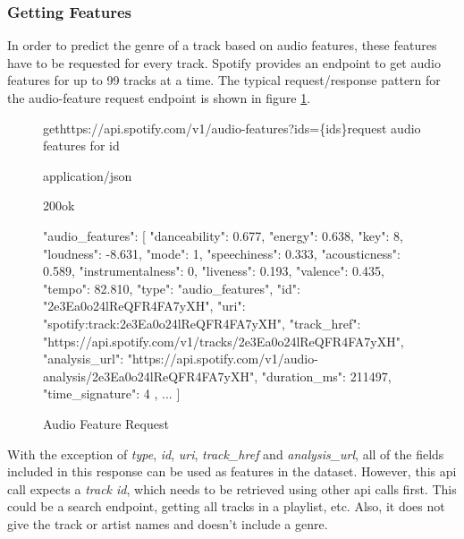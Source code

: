 \subsubsection{Getting Features}

In order to predict the genre of a track based on audio features, these features have to be requested
for every track. Spotify provides an endpoint to get audio features for up to 99 tracks at a time.
The typical request/response pattern for the audio-feature request endpoint is shown in figure \ref{fig:Audio Feature Request}.

\begin{figure}[H]
    \caption{Audio Feature Request}
	\label{fig:Audio Feature Request}
\begin{apiRoute}{get}{https://api.spotify.com/v1/audio-features?ids=\{ids\}}{request audio features for id}
    \methodJson
    \begin{routeParameter}
    \end{routeParameter}
    \begin{routeResponse}{application/json}
        \begin{routeResponseItem}{200}{ok}
            \begin{routeResponseItemBody}
{
    "audio_features": [
        {
            "danceability": 0.677,
            "energy": 0.638,
            "key": 8,
            "loudness": -8.631,
            "mode": 1,
            "speechiness": 0.333,
            "acousticness": 0.589,
            "instrumentalness": 0,
            "liveness": 0.193,
            "valence": 0.435,
            "tempo": 82.810,
            "type": "audio_features",
            "id": "2e3Ea0o24lReQFR4FA7yXH",
            "uri": "spotify:track:2e3Ea0o24lReQFR4FA7yXH",
            "track_href": "https://api.spotify.com/v1/tracks/2e3Ea0o24lReQFR4FA7yXH",
            "analysis_url": "https://api.spotify.com/v1/audio-analysis/2e3Ea0o24lReQFR4FA7yXH",
            "duration_ms": 211497,
            "time_signature": 4
        },
        ...
    ]
}
            \end{routeResponseItemBody}
        \end{routeResponseItem}
    \end{routeResponse}
\end{apiRoute}
\end{figure}

With the exception of \emph{type}, \emph{id}, \emph{uri}, \emph{track\_href} and \emph{analysis\_url}, all of the fields included in this response
can be used as features in the dataset. However, this api call expects a \emph{track id}, which needs to be retrieved using
other api calls first. This could be a search endpoint, getting all tracks in a playlist, etc.
Also, it does not give the track or artist names and doesn't include a genre.

